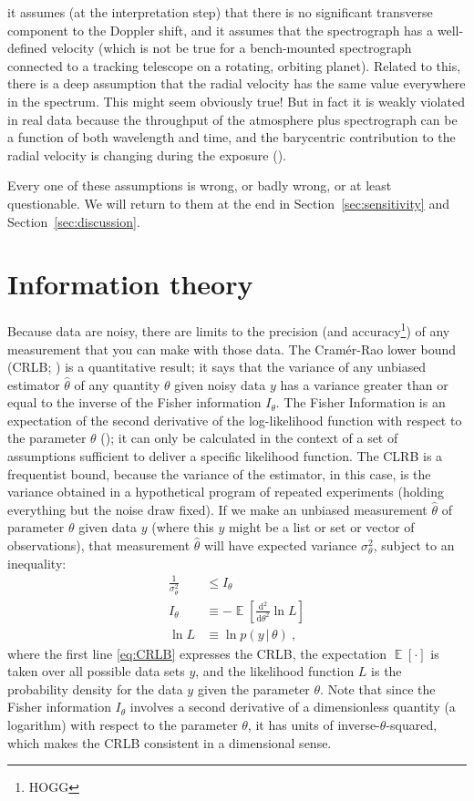 \documentclass[modern]{aastex631}
\DeclareMathOperator{\E}{\mathbb{E}}
\newcommand{\dd}{\mathrm{d}}
\newcommand{\given}{\,|\,}
\newcommand{\sectionname}{Section}
\newcommand{\secref}[1]{\sectionname~\ref{#1}}
\begin{document}
\begin{description}
    it assumes (at the interpretation step) that there is no significant transverse component to the Doppler shift,
    and it assumes that the spectrograph has a well-defined velocity (which is not be true for a bench-mounted spectrograph connected to a tracking telescope on a rotating, orbiting planet).
    Related to this, there is a deep assumption that the radial velocity has the same value everywhere in the spectrum.
    This might seem obviously true!
    But in fact it is weakly violated in real data because the throughput of the atmosphere plus spectrograph can be a function of both wavelength and time, and the barycentric contribution to the radial velocity is changing during the exposure (\citealt{berv-lambda}).
\end{description}
Every one of these assumptions is wrong, or badly wrong, or at least questionable.
We will return to them at the end in \secref{sec:sensitivity} and \secref{sec:discussion}.

\section{Information theory}\label{sec:info}

Because data are noisy, there are limits to the precision (and accuracy\footnote{HOGG}) of any measurement that you can make with those data.
The Cram\'er-Rao lower bound (CRLB; \citealt{crlb}) is a quantitative result; it says that the variance of any unbiased estimator $\widehat{\theta}$ of any quantity $\theta$ given noisy data $y$ has a variance greater than or equal to the inverse of the Fisher information $I_\theta$.
The Fisher Information is an expectation of the second derivative of the log-likelihood function with respect to the parameter $\theta$ (\citealt{fisher}); it can only be calculated in the context of a set of assumptions sufficient to deliver a specific likelihood function.
The CLRB is a frequentist bound, because the variance of the estimator, in this case, is the variance obtained in a hypothetical program of repeated experiments (holding everything but the noise draw fixed).
If we make an unbiased measurement $\widehat{\theta}$ of parameter $\theta$ given data $y$ (where this $y$ might be a list or set or vector of observations), that measurement $\widehat{\theta}$ will have expected variance $\sigma_\theta^2$, subject to an inequality:
\begin{align}
    \frac{1}{\sigma_\theta^2} &\leq I_\theta\label{eq:CRLB}\\
    I_\theta &\equiv -\E\left[\frac{\dd^2}{\dd\theta^2}\ln L\right]\label{eq:fisher}\\
    \ln L &\equiv \ln p(y\given\theta)~,
\end{align}
where the first line \eqref{eq:CRLB} expresses the CRLB,
the expectation $\E[\cdot]$ is taken over all possible data sets $y$,
and the likelihood function $L$ is the probability density for the data $y$ given the parameter $\theta$.
Note that since the Fisher information $I_\theta$ involves a second derivative of a dimensionless quantity (a logarithm) with respect to the parameter $\theta$, it has units of inverse-$\theta$-squared, which makes the CRLB consistent in a dimensional sense.
\end{document}
